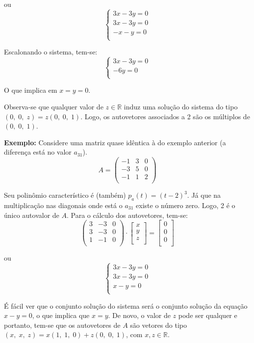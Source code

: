 ou
$$\begin{cases}3x-3y=0\\3x-3y=0\\-x-y=0\\ \end{cases}$$

Escalonando o sistema, tem-se:
$$\begin{cases}3x-3y=0\\-6y=0\\ \end{cases}$$

O que implica em $x=y=0$.

Observa-se que qualquer valor de $z\in\mathbb{R}$ induz uma solução do sistema do tipo $(0,\;0,\;z)=z(0,\;0,\;1)$. Logo, os autovetores associados a 2 são os múltiplos de $(0,\;0,\;1)$.

\textbf{Exemplo:} Considere uma matriz quase idêntica à do exemplo anterior (a diferença está no valor $a_{31}$).
$$A=\begin{pmatrix}-1 & 3 & 0\\-3 & 5 & 0\\-1 & 1 & 2\\ \end{pmatrix}$$

Seu polinômio característico é (também) $p_a(t)={(t-2)}^3$. Já que na multiplicação nas diagonais onde está o $a_{31}$ existe o número zero. Logo, 2 é o único autovalor de $A$. Para o cálculo dos autovetores, tem-se:
$$\begin{pmatrix}3 & -3 & 0\\3 & -3 & 0\\1 & -1 & 0\\ \end{pmatrix}\cdot\begin{bmatrix}x\\y\\z\\ \end{bmatrix}=\begin{bmatrix}0\\0\\0\\ \end{bmatrix}$$

ou
$$\begin{cases}3x-3y=0\\3x-3y=0\\x-y=0\\ \end{cases}$$

É fácil ver que o conjunto solução do sistema será o conjunto solução da equação $x-y=0$, o que implica que $x=y$. De novo, o valor de $z$ pode ser qualquer e portanto, tem-se que os autovetores de $A$ são vetores do tipo $(x,\;x,\;z)=x(1,\;1,\;0)+z(0,\;0,\;1)$, com $x, z\in\mathbb{R}$.